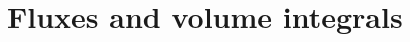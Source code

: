 \documentclass[a4paper,12pt,%
onecolumn,oneside,titlepage,%
british%
]{memoir}
\renewcommand*{\|}[1][]{\nonscript\:#1\vert\nonscript\:\mathopen{}}
\begin{document}


\printpagenotes*
\clearpage
\chapter{Fluxes and volume integrals}
\label{cha:total_flux}
\end{document}
